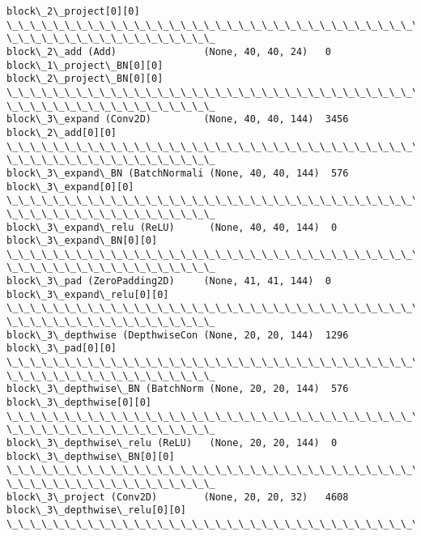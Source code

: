 \documentclass[11pt]{article}
\begin{document}
\begin{Verbatim}[commandchars=\\\{\}]
block\_2\_project[0][0]
\_\_\_\_\_\_\_\_\_\_\_\_\_\_\_\_\_\_\_\_\_\_\_\_\_\_\_\_\_\_\_\_\_\_\_\_\_\_\_\_\_\_\_\_\_\_\_\_\_\_\_\_\_\_\_\_\_\_\_\_\_\_\_\_\_\_\_\_\_\_\_\_\_\_\_\_\_\_\_\_
\_\_\_\_\_\_\_\_\_\_\_\_\_\_\_\_\_\_
block\_2\_add (Add)               (None, 40, 40, 24)   0
block\_1\_project\_BN[0][0]
block\_2\_project\_BN[0][0]
\_\_\_\_\_\_\_\_\_\_\_\_\_\_\_\_\_\_\_\_\_\_\_\_\_\_\_\_\_\_\_\_\_\_\_\_\_\_\_\_\_\_\_\_\_\_\_\_\_\_\_\_\_\_\_\_\_\_\_\_\_\_\_\_\_\_\_\_\_\_\_\_\_\_\_\_\_\_\_\_
\_\_\_\_\_\_\_\_\_\_\_\_\_\_\_\_\_\_
block\_3\_expand (Conv2D)         (None, 40, 40, 144)  3456
block\_2\_add[0][0]
\_\_\_\_\_\_\_\_\_\_\_\_\_\_\_\_\_\_\_\_\_\_\_\_\_\_\_\_\_\_\_\_\_\_\_\_\_\_\_\_\_\_\_\_\_\_\_\_\_\_\_\_\_\_\_\_\_\_\_\_\_\_\_\_\_\_\_\_\_\_\_\_\_\_\_\_\_\_\_\_
\_\_\_\_\_\_\_\_\_\_\_\_\_\_\_\_\_\_
block\_3\_expand\_BN (BatchNormali (None, 40, 40, 144)  576
block\_3\_expand[0][0]
\_\_\_\_\_\_\_\_\_\_\_\_\_\_\_\_\_\_\_\_\_\_\_\_\_\_\_\_\_\_\_\_\_\_\_\_\_\_\_\_\_\_\_\_\_\_\_\_\_\_\_\_\_\_\_\_\_\_\_\_\_\_\_\_\_\_\_\_\_\_\_\_\_\_\_\_\_\_\_\_
\_\_\_\_\_\_\_\_\_\_\_\_\_\_\_\_\_\_
block\_3\_expand\_relu (ReLU)      (None, 40, 40, 144)  0
block\_3\_expand\_BN[0][0]
\_\_\_\_\_\_\_\_\_\_\_\_\_\_\_\_\_\_\_\_\_\_\_\_\_\_\_\_\_\_\_\_\_\_\_\_\_\_\_\_\_\_\_\_\_\_\_\_\_\_\_\_\_\_\_\_\_\_\_\_\_\_\_\_\_\_\_\_\_\_\_\_\_\_\_\_\_\_\_\_
\_\_\_\_\_\_\_\_\_\_\_\_\_\_\_\_\_\_
block\_3\_pad (ZeroPadding2D)     (None, 41, 41, 144)  0
block\_3\_expand\_relu[0][0]
\_\_\_\_\_\_\_\_\_\_\_\_\_\_\_\_\_\_\_\_\_\_\_\_\_\_\_\_\_\_\_\_\_\_\_\_\_\_\_\_\_\_\_\_\_\_\_\_\_\_\_\_\_\_\_\_\_\_\_\_\_\_\_\_\_\_\_\_\_\_\_\_\_\_\_\_\_\_\_\_
\_\_\_\_\_\_\_\_\_\_\_\_\_\_\_\_\_\_
block\_3\_depthwise (DepthwiseCon (None, 20, 20, 144)  1296
block\_3\_pad[0][0]
\_\_\_\_\_\_\_\_\_\_\_\_\_\_\_\_\_\_\_\_\_\_\_\_\_\_\_\_\_\_\_\_\_\_\_\_\_\_\_\_\_\_\_\_\_\_\_\_\_\_\_\_\_\_\_\_\_\_\_\_\_\_\_\_\_\_\_\_\_\_\_\_\_\_\_\_\_\_\_\_
\_\_\_\_\_\_\_\_\_\_\_\_\_\_\_\_\_\_
block\_3\_depthwise\_BN (BatchNorm (None, 20, 20, 144)  576
block\_3\_depthwise[0][0]
\_\_\_\_\_\_\_\_\_\_\_\_\_\_\_\_\_\_\_\_\_\_\_\_\_\_\_\_\_\_\_\_\_\_\_\_\_\_\_\_\_\_\_\_\_\_\_\_\_\_\_\_\_\_\_\_\_\_\_\_\_\_\_\_\_\_\_\_\_\_\_\_\_\_\_\_\_\_\_\_
\_\_\_\_\_\_\_\_\_\_\_\_\_\_\_\_\_\_
block\_3\_depthwise\_relu (ReLU)   (None, 20, 20, 144)  0
block\_3\_depthwise\_BN[0][0]
\_\_\_\_\_\_\_\_\_\_\_\_\_\_\_\_\_\_\_\_\_\_\_\_\_\_\_\_\_\_\_\_\_\_\_\_\_\_\_\_\_\_\_\_\_\_\_\_\_\_\_\_\_\_\_\_\_\_\_\_\_\_\_\_\_\_\_\_\_\_\_\_\_\_\_\_\_\_\_\_
\_\_\_\_\_\_\_\_\_\_\_\_\_\_\_\_\_\_
block\_3\_project (Conv2D)        (None, 20, 20, 32)   4608
block\_3\_depthwise\_relu[0][0]
\_\_\_\_\_\_\_\_\_\_\_\_\_\_\_\_\_\_\_\_\_\_\_\_\_\_\_\_\_\_\_\_\_\_\_\_\_\_\_\_\_\_\_\_\_\_\_\_\_\_\_\_\_\_\_\_\_\_\_\_\_\_\_\_\_\_\_\_\_\_\_\_\_\_\_\_\_\_\_\_

\end{Verbatim}
\end{document}

